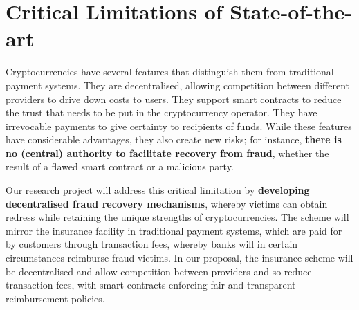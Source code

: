 
\section{Critical Limitations of State-of-the-art}\label{sec::Research-Gaps}


Cryptocurrencies have several features that distinguish them from traditional payment systems. They are decentralised, allowing competition between different providers to drive down costs to users. They support smart contracts to reduce the trust that needs to be put in the cryptocurrency operator. They have irrevocable payments to give certainty to recipients of funds. While these features have considerable advantages, they also create new risks; for instance, \textbf{there is no (central) authority to facilitate recovery from fraud}, whether the result of a flawed smart contract or a malicious party. 

Our research project will address this critical limitation by \textbf{developing decentralised fraud recovery mechanisms}, whereby victims can obtain redress while retaining the unique strengths of cryptocurrencies. The scheme will mirror the insurance facility in traditional payment systems, which are paid for by customers through transaction fees, whereby banks will in certain circumstances reimburse fraud victims. In our proposal, the insurance scheme will be decentralised and allow competition between providers and so reduce transaction fees, with smart contracts enforcing fair and transparent reimbursement policies. %

